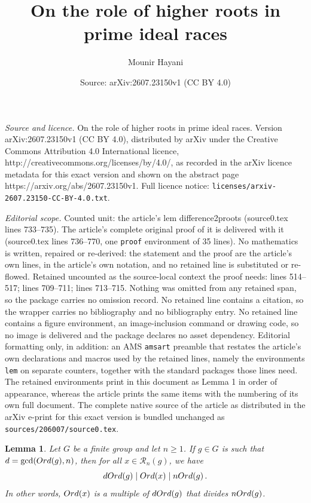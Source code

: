 \documentclass[10pt,a4paper]{amsart}
\title{On the role of higher roots in prime ideal races}
\author{Mounir Hayani}
\date{Source: arXiv:2607.23150v1 (CC BY 4.0)}
\newtheorem{lem}{Lemma}
\newcommand{\Ord}{{\rm Ord}}
\begin{document}
\maketitle

\noindent\emph{Source and licence.} On the role of higher roots in prime ideal races. Version arXiv:2607.23150v1 (CC BY 4.0), distributed by arXiv under the Creative Commons Attribution 4.0 International licence, http://creativecommons.org/licenses/by/4.0/, as recorded in the arXiv licence metadata for this exact version and shown on the abstract page https://arxiv.org/abs/2607.23150v1. Full licence notice: \texttt{licenses/arxiv-2607.23150-CC-BY-4.0.txt}.\par\smallskip

\noindent\textit{Editorial scope.} Counted unit: the article's lem difference2proots (source0.tex lines 733--735). The article's complete original proof of it is delivered with it (source0.tex lines 736--770, one \texttt{proof} environment of 35 lines). No mathematics is written, repaired or re-derived: the statement and the proof are the article's own lines, in the article's own notation, and no retained line is substituted or re-flowed.  Retained uncounted as the source-local context the proof needs: lines 514--517; lines 709--711; lines 713--715.  Nothing was omitted from any retained span, so the package carries no omission record.  No retained line contains a citation, so the wrapper carries no bibliography and no bibliography entry.  No retained line contains a figure environment, an image-inclusion command or drawing code, so no image is delivered and the package declares no asset dependency.  Editorial formatting only, in addition: an AMS \texttt{amsart} preamble that restates the article's own declarations and macros used by the retained lines, namely the environments \texttt{lem} on separate counters, together with the standard packages those lines need.  The retained environments print in this document as Lemma 1 in order of appearance, whereas the article prints the same items with the numbering of its own full document.  The complete native source of the article as distributed in the arXiv e-print for this exact version is bundled unchanged as \texttt{sources/206007/source0.tex}.
\begin{lem}\label{rootorder}
    Let $G$ be a finite group and let $n\ge 1$. If $g\in G$ is such that $d=\gcd(\Ord(g),n)$, then for all $x\in \mathcal{R}_n(g)$, we have \[ d\Ord(g) \mid \Ord(x)\mid n\Ord(g)\, .\]
    In other words, $\Ord(x)$ is a multiple of $d\Ord(g)$ that divides $n\Ord(g)$.
\end{lem}
\end{document}
